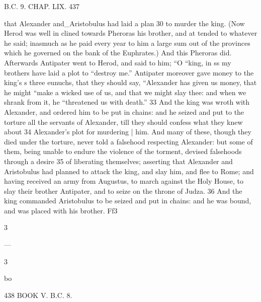 B.C. 9. CHAP. LIX. 437 

that Alexander and_Aristobulus had laid a plan 
30 to murder the king. (Now Herod was well in
clined towards Pheroras his brother, and at
tended to whatever he said; inasmuch as he paid every year to him a large sum out of the provinces which he governed on the bank of the 
Euphrates.) And this Pheroras did. Afterwards 
Antipater went to Herod, and said to him; “O 
“king, in ss my brothers have laid a plot to 
“destroy me.” Antipater moreover gave money 
to the king's s three eunuchs, that they should say, 
“Alexander has given us money, that he might 
“make a wicked use of us, and that we might 
 slay thee: and when we shrank from it, he 
“threatened us with death.” 
33 And the king was wroth with Alexander, and ordered him to be put in chains: and he seized and put to the torture all the servants of Alexander, till they should confess what they knew about 
34 Alexander’s plot for murdering | him. And many of these, though they died under the torture, never told a falsehood respecting Alexander: but some of them, being unable to endure the violence of the torment, devised falsehoods through a desire 
35 of liberating themselves; asserting that Alexander and Aristobulus had planned to attack the king, and slay him, and flee to Rome; and having received an army from Augustus, to march against the Holy House, to slay their brother Antipater, and to seize on the throne of Judza. 
36 And the king commanded Aristobulus to be seized and put in chains: and he was bound, and was placed with his brother. 
Ff3 

3 

— 

3 

bo 

438 BOOK V. B.C. 8. 

